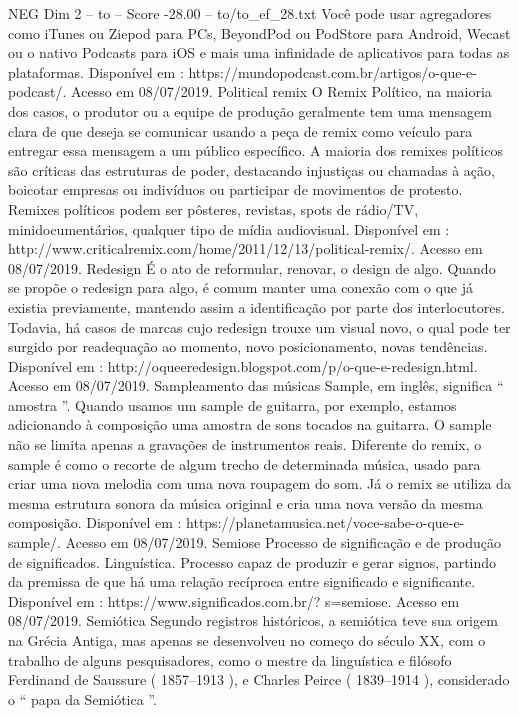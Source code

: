 \begin{textsample}{NEG Dim 2 – to – Score -28.00 – to/to\_ef\_28.txt}
Você pode usar agregadores como iTunes ou Ziepod para PCs, BeyondPod ou PodStore para Android, Wecast ou o nativo Podcasts para iOS e mais uma infinidade de aplicativos para todas as plataformas.
Disponível em : https://mundopodcast.com.br/artigos/o-que-e-podcast/.
Acesso em 08/07/2019.
Political remix O Remix Político, na maioria dos casos, o produtor ou a equipe de produção geralmente tem uma mensagem clara de que deseja se comunicar usando a peça de remix como veículo para entregar essa mensagem a um público específico.
A maioria dos remixes políticos são críticas das estruturas de poder, destacando injustiças ou chamadas à ação, boicotar empresas ou indivíduos ou participar de movimentos de protesto.
Remixes políticos podem ser pôsteres, revistas, spots de rádio/TV, minidocumentários, qualquer tipo de mídia audiovisual.
Disponível em : http://www.criticalremix.com/home/2011/12/13/political-remix/.
Acesso em 08/07/2019.
Redesign É o ato de reformular, renovar, o design de algo.
Quando se propõe o redesign para algo, é comum manter uma conexão com o que já existia previamente, mantendo assim a identificação por parte dos interlocutores.
Todavia, há casos de marcas cujo redesign trouxe um visual novo, o qual pode ter surgido por readequação ao momento, novo posicionamento, novas tendências.
Disponível em : http://oqueeredesign.blogspot.com/p/o-que-e-redesign.html.
Acesso em 08/07/2019.
Sampleamento das músicas Sample, em inglês, significa “ amostra ”.
Quando usamos um sample de guitarra, por exemplo, estamos adicionando à composição uma amostra de sons tocados na guitarra.
O sample não se limita apenas a gravações de instrumentos reais.
Diferente do remix, o sample é como o recorte de algum trecho de determinada música, usado para criar uma nova melodia com uma nova roupagem do som.
Já o remix se utiliza da mesma estrutura sonora da música original e cria uma nova versão da mesma composição.
Disponível em : https://planetamusica.net/voce-sabe-o-que-e-sample/.
Acesso em 08/07/2019.
Semiose Processo de significação e de produção de significados.
Linguística.
Processo capaz de produzir e gerar signos, partindo da premissa de que há uma relação recíproca entre significado e significante.
Disponível em : https://www.significados.com.br/? s=semiose.
Acesso em 08/07/2019.
Semiótica Segundo registros históricos, a semiótica teve sua origem na Grécia Antiga, mas apenas se desenvolveu no começo do século XX, com o trabalho de alguns pesquisadores, como o mestre da linguística e filósofo Ferdinand de Saussure ( 1857–1913 ), e Charles Peirce ( 1839–1914 ), considerado o “ papa da Semiótica ”.

\end{textsample}
